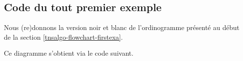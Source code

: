 \documentclass[12pt,a4paper]{article}
\begin{document}

\subsection{Code du tout premier exemple} \label{tnsalgo-flowchart-firstexa-code}

Nous (re)donnons la version noir et blanc de l'ordinogramme présenté au début de la section \ref{tnsalgo-flowchart-firstexa}.

\acusebw
\begin{center}
    \small
    
\end{center}
\acusecolor

Ce diagramme s'obtient via le code suivant.

\end{document}
